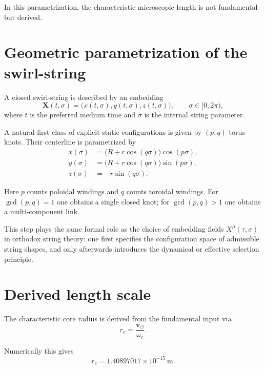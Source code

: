\documentclass[12pt,a4paper]{article}
\begin{document}
        In this parametrization, the characteristic microscopic length is not fundamental but derived.
    
    \section{Geometric parametrization of the swirl-string}
        
        A closed swirl-string is described by an embedding
        \[
            \mathbf{X}(t,\sigma)=\bigl(x(t,\sigma),y(t,\sigma),z(t,\sigma)\bigr),
            \qquad
            \sigma \in [0,2\pi),
        \]
        where \(t\) is the preferred medium time and \(\sigma\) is the internal string parameter.
        
        A natural first class of explicit static configurations is given by \((p,q)\) torus knots. Their centerline is parametrized by
        \begin{align}
            x(\sigma) &= \bigl(R + r\cos(q\sigma)\bigr)\cos(p\sigma), \\
            y(\sigma) &= \bigl(R + r\cos(q\sigma)\bigr)\sin(p\sigma), \\
            z(\sigma) &= -r\sin(q\sigma).
        \end{align}
        
        Here \(p\) counts poloidal windings and \(q\) counts toroidal windings. For \(\gcd(p,q)=1\) one obtains a single closed knot; for \(\gcd(p,q)>1\) one obtains a multi-component link.
        
        This step plays the same formal role as the choice of embedding fields \(X^\mu(\tau,\sigma)\) in orthodox string theory: one first specifies the configuration space of admissible string shapes, and only afterwards introduces the dynamical or effective selection principle.
    
    \section{Derived length scale}
        
        The characteristic core radius is derived from the fundamental input via
        \begin{equation}
            r_c = \frac{\mathbf{v}_{\!\boldsymbol{\circlearrowleft}}}{\omega_c}.
        \end{equation}
        
        Numerically this gives
        \begin{equation}
            r_c = 1.40897017\times 10^{-15}\ \mathrm{m}.
        \end{equation}
        
\end{document}
